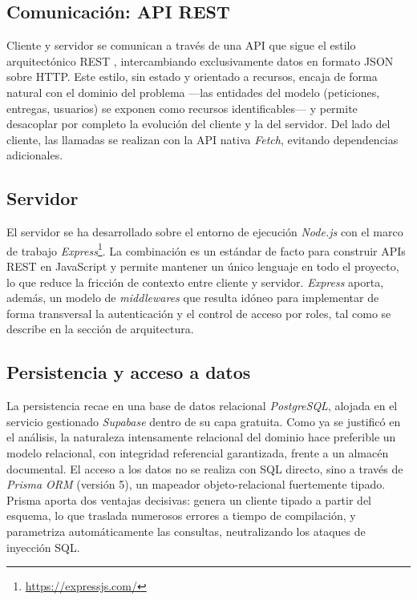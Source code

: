 \documentclass[11pt,oneside,spanish,listoffigures,listoftables]{tfgetsinf}
\begin{document}
\subsection{Comunicación: API REST}

Cliente y servidor se comunican a través de una API que sigue el estilo arquitectónico REST \cite{fielding_rest}, intercambiando exclusivamente datos en formato JSON sobre HTTP. Este estilo, sin estado y orientado a recursos, encaja de forma natural con el dominio del problema —las entidades del modelo (peticiones, entregas, usuarios) se exponen como recursos identificables— y permite desacoplar por completo la evolución del cliente y la del servidor. Del lado del cliente, las llamadas se realizan con la API nativa \textit{Fetch}, evitando dependencias adicionales.

\subsection{Servidor}

El servidor se ha desarrollado sobre el entorno de ejecución \textit{Node.js} con el marco de trabajo \textit{Express}\footnote{\url{https://expressjs.com/}}. La combinación es un estándar de facto para construir APIs REST en JavaScript y permite mantener un único lenguaje en todo el proyecto, lo que reduce la fricción de contexto entre cliente y servidor. \textit{Express} aporta, además, un modelo de \textit{middlewares} que resulta idóneo para implementar de forma transversal la autenticación y el control de acceso por roles, tal como se describe en la sección de arquitectura.

\subsection{Persistencia y acceso a datos}

La persistencia recae en una base de datos relacional \textit{PostgreSQL}, alojada en el servicio gestionado \textit{Supabase} dentro de su capa gratuita. Como ya se justificó en el análisis, la naturaleza intensamente relacional del dominio hace preferible un modelo relacional, con integridad referencial garantizada, frente a un almacén documental. El acceso a los datos no se realiza con SQL directo, sino a través de \textit{Prisma ORM} (versión 5), un mapeador objeto-relacional fuertemente tipado. Prisma aporta dos ventajas decisivas: genera un cliente tipado a partir del esquema, lo que traslada numerosos errores a tiempo de compilación, y parametriza automáticamente las consultas, neutralizando los ataques de inyección SQL.
\end{document}
